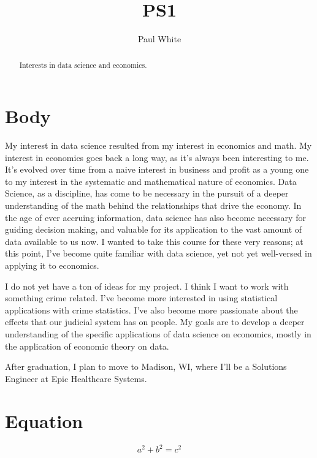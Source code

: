 \documentclass{article}
\title{PS1}
\author{Paul White}
\begin{document}
\maketitle

\begin{abstract}
Interests in data science and economics.
\end{abstract}

\section{Body}

My interest in data science resulted from my interest in economics and math. My interest in economics goes back a long way, as it's always been interesting to me. It's evolved over time from a naive interest in business and profit as a young one to my interest in the systematic and mathematical nature of economics. Data Science, as a discipline, has come to be necessary in the pursuit of a deeper understanding of the math behind the relationships that drive the economy. In the age of ever accruing information, data science has also become necessary for guiding decision making, and valuable for its application to the vast amount of data available to us now. I wanted to take this course for these very reasons; at this point, I've become quite familiar with data science, yet not yet well-versed in applying it to economics.

I do not yet have a ton of ideas for my project. I think I want to work with something crime related. I've become more interested in using statistical applications with crime statistics. I've also become more passionate about the effects that our judicial system has on people. My goals are to develop a deeper understanding of the specific applications of data science on economics, mostly in the application of economic theory on data.

After graduation, I plan to move to Madison, WI, where I'll be a Solutions Engineer at Epic Healthcare Systems.


\section{Equation}
$$a^2+b^2=c^2$$
\end{document}
